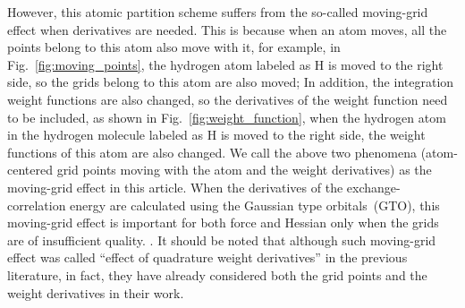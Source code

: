 \documentclass[journal=jpca,manuscript=article]{achemso}
\begin{document}
However, this atomic partition scheme suffers from the so-called moving-grid effect
when derivatives are needed. This is because when an atom moves, all the points belong to this atom also move with it, for example, in Fig.~\ref{fig:moving_points}, the hydrogen atom labeled as H is moved to the right side, so the grids belong to this atom are also moved; In addition,
the integration weight functions are  also changed, so the derivatives of the weight function need to be included, as shown in Fig.~\ref{fig:weight_function}, 
when the hydrogen atom in the hydrogen molecule labeled as H is moved to the right side, the weight functions of this atom are also changed.
We call the above two phenomena (atom-centered grid points moving with the atom and the weight derivatives) as the moving-grid effect in this article. When the derivatives of the exchange-correlation energy are calculated using the Gaussian type orbitals~(GTO), this moving-grid effect is important for both force and Hessian only when the grids are of insufficient quality. \cite{Johnson1993a,Baker1994,Malagoli2003}.  It should be noted that although such moving-grid effect was called ``effect of quadrature weight derivatives'' in the previous literature\cite{Johnson1993,Baker1994,Malagoli2003}, in fact, they have already considered both the grid points and the weight derivatives in their work.
\end{document}
